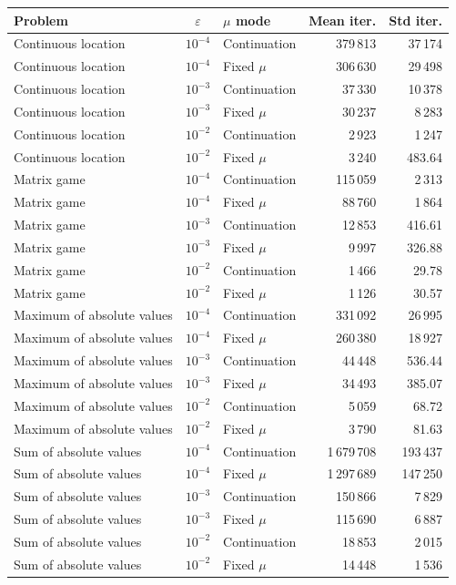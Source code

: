 \begin{tabular}{lclrr}
\toprule
Problem & $\varepsilon$ & $\mu$ mode & Mean iter. & Std iter. \\
\midrule
Continuous location & $10^{-4}$ & Continuation & 379\,813 & 37\,174 \\
Continuous location & $10^{-4}$ & Fixed $\mu$ & 306\,630 & 29\,498 \\
Continuous location & $10^{-3}$ & Continuation & 37\,330 & 10\,378 \\
Continuous location & $10^{-3}$ & Fixed $\mu$ & 30\,237 & 8\,283 \\
Continuous location & $10^{-2}$ & Continuation & 2\,923 & 1\,247 \\
Continuous location & $10^{-2}$ & Fixed $\mu$ & 3\,240 & 483.64 \\
Matrix game & $10^{-4}$ & Continuation & 115\,059 & 2\,313 \\
Matrix game & $10^{-4}$ & Fixed $\mu$ & 88\,760 & 1\,864 \\
Matrix game & $10^{-3}$ & Continuation & 12\,853 & 416.61 \\
Matrix game & $10^{-3}$ & Fixed $\mu$ & 9\,997 & 326.88 \\
Matrix game & $10^{-2}$ & Continuation & 1\,466 & 29.78 \\
Matrix game & $10^{-2}$ & Fixed $\mu$ & 1\,126 & 30.57 \\
Maximum of absolute values & $10^{-4}$ & Continuation & 331\,092 & 26\,995 \\
Maximum of absolute values & $10^{-4}$ & Fixed $\mu$ & 260\,380 & 18\,927 \\
Maximum of absolute values & $10^{-3}$ & Continuation & 44\,448 & 536.44 \\
Maximum of absolute values & $10^{-3}$ & Fixed $\mu$ & 34\,493 & 385.07 \\
Maximum of absolute values & $10^{-2}$ & Continuation & 5\,059 & 68.72 \\
Maximum of absolute values & $10^{-2}$ & Fixed $\mu$ & 3\,790 & 81.63 \\
Sum of absolute values & $10^{-4}$ & Continuation & 1\,679\,708 & 193\,437 \\
Sum of absolute values & $10^{-4}$ & Fixed $\mu$ & 1\,297\,689 & 147\,250 \\
Sum of absolute values & $10^{-3}$ & Continuation & 150\,866 & 7\,829 \\
Sum of absolute values & $10^{-3}$ & Fixed $\mu$ & 115\,690 & 6\,887 \\
Sum of absolute values & $10^{-2}$ & Continuation & 18\,853 & 2\,015 \\
Sum of absolute values & $10^{-2}$ & Fixed $\mu$ & 14\,448 & 1\,536 \\
\bottomrule
\end{tabular}